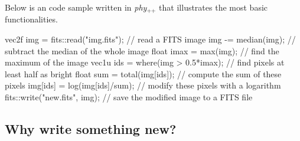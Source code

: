 \documentclass[12pt,a4paper]{report}
\newcommand{\phypp}{\textit{phy}$_{\text{++}}$\xspace}
\begin{document}
Below is an code sample written in \phypp that illustrates the most basic functionalities.

\begin{cppcode}
vec2f img = fits::read("img.fits"); // read a FITS image
img -= median(img);                 // subtract the median of the whole image
float imax = max(img);              // find the maximum of the image
vec1u ids = where(img > 0.5*imax);  // find pixels at least half as bright
float sum = total(img[ids]);        // compute the sum of these pixels
img[ids] = log(img[ids]/sum);       // modify these pixels with a logarithm
fits::write("new.fits", img);       // save the modified image to a FITS file
\end{cppcode}

\subsection{Why write something new?}
\end{document}
